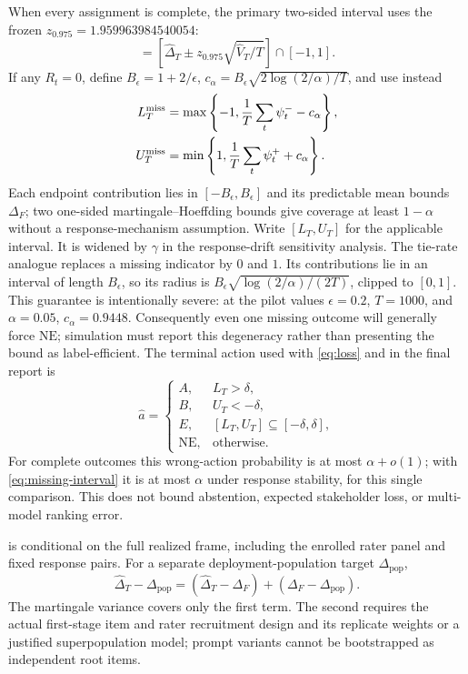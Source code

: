 \documentclass{article}
\begin{document}
When every assignment is complete, the primary two-sided interval uses the
frozen $z_{0.975}=1.959963984540054$:
\begin{equation}
[L_T^{\rm cmp},U_T^{\rm cmp}]=
\left[\widehat\Delta_T\pm
z_{0.975}\sqrt{\widehat V_T/T}\right]\cap[-1,1].
\end{equation}
If any $R_t=0$, define $B_\epsilon=1+2/\epsilon$,
$c_\alpha=B_\epsilon\sqrt{2\log(2/\alpha)/T}$, and use instead
\begin{equation}
\begin{aligned}
L_T^{\rm miss}
&=\max\left\{-1,\frac1T\sum_t\psi_t^- -c_\alpha\right\},\\
U_T^{\rm miss}
&=\min\left\{1,\frac1T\sum_t\psi_t^+ +c_\alpha\right\}.
\end{aligned}
\label{eq:missing-interval}
\end{equation}
Each endpoint contribution lies in $[-B_\epsilon,B_\epsilon]$ and its
predictable mean bounds $\Delta_F$; two one-sided martingale--Hoeffding bounds
give coverage at least $1-\alpha$ without a response-mechanism assumption.
Write $[L_T,U_T]$ for the applicable interval. It is widened by $\gamma$ in
the response-drift sensitivity analysis. The tie-rate analogue replaces a
missing indicator by $0$ and $1$. Its contributions lie in an interval of
length $B_\epsilon$, so its radius is
$B_\epsilon\sqrt{\log(2/\alpha)/(2T)}$, clipped to $[0,1]$.
This guarantee is intentionally severe: at the pilot values
$\epsilon=0.2$, $T=1000$, and $\alpha=0.05$, $c_\alpha=0.9448$.
Consequently even one missing outcome will generally force
$\mathrm{NE}$; simulation must report this degeneracy rather than presenting
the bound as label-efficient.
The terminal action used with \cref{eq:loss} and in the final report is
\begin{equation}
\widehat a=
\begin{cases}
A,&L_T>\delta,\\
B,&U_T<-\delta,\\
E,&[L_T,U_T]\subseteq[-\delta,\delta],\\
\mathrm{NE},&\text{otherwise}.
\end{cases}
\end{equation}
For complete outcomes this wrong-action probability is at most
$\alpha+o(1)$; with \cref{eq:missing-interval} it is at most $\alpha$ under
response stability, for this single comparison.
This does not bound
abstention, expected stakeholder loss, or multi-model ranking error.

 is conditional on the full realized frame, including the enrolled
rater panel and fixed response pairs. For a separate deployment-population
target $\Delta_{\mathrm{pop}}$,
\begin{equation}
\widehat\Delta_T-\Delta_{\mathrm{pop}}
=(\widehat\Delta_T-\Delta_F)+(\Delta_F-\Delta_{\mathrm{pop}}).
\end{equation}
The martingale variance covers only the first term. The second requires the
actual first-stage item and rater recruitment design and its replicate weights
or a justified superpopulation model; prompt variants cannot be bootstrapped
as independent root items.
\end{document}
